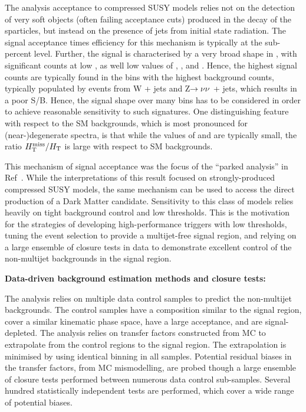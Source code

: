 The analysis acceptance to compressed SUSY models relies not on
the detection of very soft objects (often failing acceptance cuts)
produced in the decay of the sparticles, but instead on the presence
of jets from initial state radiation. The signal acceptance times
efficiency for this mechanism is typically at the sub-percent level.
Further, the signal is characterised by a very broad shape in \scalht,
with significant counts at low \scalht, as well low values of \njet,
\nb, and \mht. Hence, the highest signal counts are typically found in
the bins with the highest background counts, typically populated by
events from W + jets and Z$\rightarrow\nu\nu$ + jets, which results in a poor
S/B. Hence, the signal shape over many bins has to be considered in
order to achieve reasonable sensitivity to such signatures. One
distinguishing feature with respect to the SM backgrounds, which is
most pronounced for (near-)degenerate spectra, is that while the
values of \scalht and \mht are typically small, the ratio $\mbox{$H_{\rm T}^{\rm miss}$} /
\mbox{$H_\text{T}$}$ is large with respect to SM backgrounds.

This mechanism of signal acceptance was the focus of the ``parked
analysis'' in Ref~\cite{CMS_AN_2013-366}. While the interpretations of
this result focused on strongly-produced compressed SUSY models, the
same mechanism can be used to access the direct production of a Dark
Matter candidate. Sensitivity to this
class of models relies heavily on tight background control and low
thresholds. This is the motivation for the strategies of developing
high-performance triggers with low thresholds, tuning the event
selection to provide a multijet-free signal region, and relying on a
large ensemble of closure tests in data to demonstrate excellent
control of the non-multijet backgrounds in the signal region.

{\bf Data-driven background estimation methods and closure tests:}

The analysis relies on multiple data control samples to predict the
non-multijet backgrounds. The control samples have a composition
similar to the signal region, cover a similar kinematic phase
space, have a large acceptance, and are signal-depleted. The analysis
relies on transfer factors constructed from MC to extrapolate from the
control regions to the signal region. The extrapolation is minimised
by using identical binning in all samples. Potential residual biases
in the transfer factors, \eg from MC mismodelling, are probed though a
large ensemble of closure tests performed between numerous data
control sub-samples. Several hundred statistically independent tests
are performed, which cover a wide range of potential biases. 

